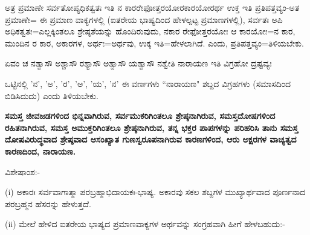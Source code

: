 ಅತ್ರ ಪ್ರಮಾಣೇ ಸರ್ವತೋಪ್ಯಧಿಕತ್ವತಃ ಇತಿ ನ ಕಾರರೇಫೋತ್ತರಯೋರಕಾರಯೋರರ್ಥ ಉಕ್ತ ಇತಿ ಪ್ರತಿಪತ್ತವ್ಯಂ-ಅತ ಪ್ರಮಾಣೇ= ಈ ಪ್ರಮಾಣ ವಾಕ್ಯಗಳಲ್ಲಿ (ಐತರೇಯ ಭಾಷ್ಯದಿಂದ ಹೇಳಲ್ಪಟ್ಟ ಪ್ರಮಾಣಗಳಲ್ಲಿ), ಸರ್ವತಃ ಅಪಿ ಅಧಿಕತ್ವತಃ=ಎಲ್ಲಕ್ಕಿಂತಲೂ ಶ್ರೇಷ್ಠತೆಯನ್ನು ಹೊಂದಿರುವುದು, ನಕಾರ ರೇಫೋತ್ತರಯೋಃ ಆ ಕಾರಯೋಃ=ನ ಕಾರ, ಮುಂದಿನ ರ ಕಾರ, ಅಕಾರಗಳ, ಅರ್ಥಃ=ಅರ್ಥವು, ಉಕ್ಕ ಇತಿ=ಹೇಳಲಾಗಿದೆ. ಎಂದು, ಪ್ರತಿಪತ್ತವ್ಯಂ=ತಿಳಿಯಬೇಕು.

ಏವಂ ಚ ನಶ್ವಾಸೌ ಅಶ್ಚಾಸೌ ರಶ್ಯಾಸೌ ಅಶ್ವಾಸೌ ಯಶ್ವಾಸೌ ನಶ್ವೇತಿ ನಾರಾಯಣ ಇತಿ ವಿಗ್ರಹೋ ದ್ರಷ್ಟವ್ಯಃ

ಒಟ್ಟಿನಲ್ಲಿ 'ನ', 'ಅ', 'ರ', 'ಅ', 'ಯ', 'ನ' ಈ ವರ್ಣಗಳು ``ನಾರಾಯಣ" ಶಬ್ದದ ವಿಗ್ರಹಗಳು (ಸಮಾಸದಿಂದ ಬಿಡಿಸಿದುದು) ಎಂದು ತಿಳಿಯಬೇಕು.

\textbf{ಸಮಸ್ತ ಜೀವಜಡಗಳಿಂದ ಭಿನ್ನವಾಗಿರುವ, ಸರ್ವಮುಕರಿಗಿಂತಲೂ ಶ್ರೇಷ್ಠನಾಗಿರುವ, ಸಮಸ್ತದೋಷಗಳಿಂದ ರಹಿತನಾಗಿರುವ, ಸಮಸ್ತ ಅಮುಕ್ತರಿಗಿಂತಲೂ ಶ್ರೇಷ್ಠನಾಗಿರುವ, ತನ್ನ ಭಕ್ತರ ಪಾಪಗಳನ್ನು ಪರಿಹರಿಸಿ ತಾನು ಸಮಸ್ತ ದೋಷವಿರುದ್ಧವಾದ ಶ್ರೇಷ್ಠವಾದ ಅಸಂಖ್ಯಾತ ಗುಣಸ್ವರೂಪನಾಗಿರುವ ಕಾರಣಗಳಿಂದ, ಆರು ಅಕ್ಷರಗಳ ವಾಚ್ಯತ್ವದ ಕಾರಣದಿಂದ, ನಾರಾಯಣ.}

\noindent
ವಿಶೇಷಾಂಶ:-

(i) ಅಕಾರಃ ಸರ್ವವಾಗಾತ್ಮಾ ಪರಬ್ರಹ್ಮಾಭಿದಾಯಕಃ-ಭಾಷ್ಯ. ಅಕಾರವು ಸಕಲ ಶಬ್ದಗಳ ಮುಖ್ಯಾರ್ಥವಾದ ಪೂರ್ಣನಾದ ಪರಬ್ರಹ್ಮನ ಹೆಸರನ್ನು ಹೇಳುತ್ತದೆ.

(ii) ಮೇಲೆ ಹೇಳಿದ ಐತರೇಯ ಭಾಷ್ಯದ ಪ್ರಮಾಣವಾಕ್ಯಗಳ ಅರ್ಥವನ್ನು ಸಂಗ್ರಹವಾಗಿ ಹೀಗೆ ಹೇಳಬಹುದು:-

